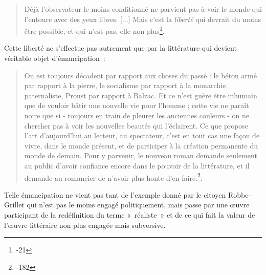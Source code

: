 \documentclass[12pt, a4paper]{article}
\begin{document}
\begin{quote}
    Déjà l'observateur le moins conditionné ne parvient pas à voir le monde qui l'entoure avec des yeux libres. [...] Mais c'est la \textit{liberté} qui devrait du moins être possible, et qui n'est pas, elle non plus\footnote{-21}.
\end{quote}
Cette liberté ne s'effectue pas autrement que par la littérature qui devient véritable objet d'émancipation~:
\begin{quote}
    On est toujours décadent par rapport aux choses du passé : le béton armé par rapport à la pierre, le socialisme par rapport à la monarchie paternaliste, Proust par rapport à Balzac. Et ce n'est guère être inhumain que de vouloir bâtir une nouvelle vie pour l'homme ; cette vie ne paraît noire que si - toujours en train de pleurer les anciennes couleurs - on ne chercher pas à voir les nouvelles beautés qui l'éclairent. Ce que propose l’art d’aujourd’hui au lecteur, au spectateur, c’est en tout cas une façon de vivre, dans le monde présent, et de participer à la création permanente du monde de demain. Pour y parvenir, le nouveau roman demande seulement au public d’avoir confiance encore dans le pouvoir de la littérature, et il demande au romancier de n’avoir plus honte d’en faire.\footnote{-182}.
\end{quote}

Telle émancipation ne vient pas tant de l'exemple donné par le citoyen Robbe-Grillet qui n'est pas le moins engagé politiquement, mais passe par une œuvre participant de la redéfinition du terme «~réaliste~» et de ce qui fait la valeur de l'œuvre littéraire non plus engagée mais subversive.

  
\end{document}
